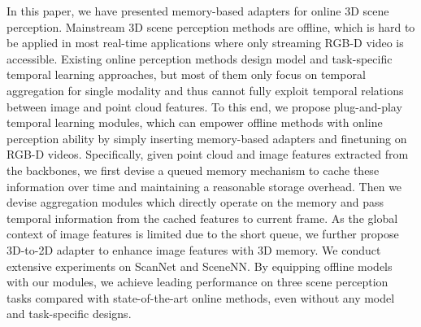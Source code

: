 In this paper, we have presented memory-based adapters for online 3D scene perception. Mainstream 3D scene perception methods are offline, which is hard to be applied in most real-time applications where only streaming RGB-D video is accessible. Existing online perception methods design model and task-specific temporal learning approaches, but most of them only focus on temporal aggregation for single modality and thus cannot fully exploit temporal relations between image and point cloud features. 
To this end, we propose plug-and-play temporal learning modules, which can empower offline methods with online perception ability by simply inserting memory-based adapters and finetuning on RGB-D videos. Specifically, given point cloud and image features extracted from the backbones, we first devise a queued memory mechanism to cache these information over time and maintaining a reasonable storage overhead. Then we devise aggregation modules which directly operate on the memory and pass temporal information from the cached features to current frame. As the global context of image features is limited due to the short queue, we further propose 3D-to-2D adapter to enhance image features with 3D memory.
We conduct extensive experiments on ScanNet and SceneNN. By equipping offline models with our modules, we achieve leading performance on three scene perception tasks compared with state-of-the-art online methods, even without any model and task-specific designs.